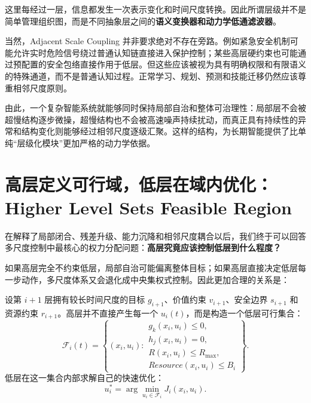 这里每经过一层，信息都发生一次表示变化和时间尺度转换。因此所谓层级并不是简单管理组织图，而是不同抽象层之间的\textbf{语义变换器和动力学低通滤波器}。

当然，Adjacent Scale Coupling 并非要求绝对不存在旁路。例如紧急安全机制可能允许实时危险信号绕过普通认知链直接进入保护控制；某些高层硬约束也可能通过预配置的安全包络直接作用于低层。但这些应该被视为具有明确权限和有限语义的特殊通道，而不是普通认知过程。正常学习、规划、预测和技能迁移仍然应该尊重相邻尺度原则。

由此，一个复杂智能系统就能够同时保持局部自治和整体可治理性：局部层不会被超慢结构逐步微操，超慢结构也不会被高速噪声持续扰动，而真正具有持续性的异常和结构变化则能够经过相邻尺度逐级汇聚。这样的结构，为长期智能提供了比单纯``层级化模块''更加严格的动力学依据。

\section{高层定义可行域，低层在域内优化：Higher Level Sets Feasible Region}

在解释了局部闭合、残差升级、能力沉降和相邻尺度耦合以后，我们终于可以回答多尺度控制中最核心的权力分配问题：\textbf{高层究竟应该控制低层到什么程度？}

如果高层完全不约束低层，局部自治可能偏离整体目标；如果高层直接决定低层每一步动作，多尺度体系又会退化成中央集权式控制。因此更加合理的关系是：
\begin{statementbox}
\centering
{}
\end{statementbox}

设第 $i+1$ 层拥有较长时间尺度的目标 $g_{i+1}$、价值约束 $v_{i+1}$、安全边界 $s_{i+1}$ 和资源约束 $r_{i+1}$。高层并不直接产生每一个 $u_i(t)$，而是构造一个低层可行集合：
\begin{equation}
\mathcal F_i(t)
=
\left\{
(x_i,u_i):
\begin{array}{l}
g_k(x_i,u_i)\leq 0,\\
h_j(x_i,u_i)=0,\\
R(x_i,u_i)\leq R_{\max},\\
Resource(x_i,u_i)\leq B_i
\end{array}
\right\}.
\end{equation}
低层在这一集合内部求解自己的快速优化：
\begin{equation}
u_i^\ast
=
\arg\min_{u_i\in\mathcal F_i}
J_i(x_i,u_i).
\end{equation}

